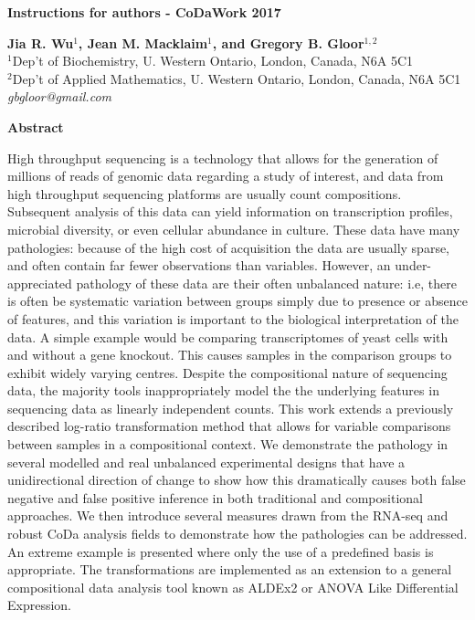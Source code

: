 \documentclass [10pt]{article}
\begin{document}
\begin{center}
\textbf{\large Instructions for authors - CoDaWork 2017}

\vskip 0.25cm

\textbf{Jia R. Wu}$^{1}$\textbf{, Jean M. Macklaim}$^{1}$\textbf{, and
Gregory B. Gloor}$^{1,2}$ \\
{\small $^{1}$Dep't of Biochemistry, U. Western Ontario, London, Canada, N6A 5C1\\
$^{2}$Dep't of Applied Mathematics, U. Western Ontario, London, Canada, N6A 5C1 \\
\textit{gbgloor@gmail.com} \\
}
\end{center}

\vskip 0.5cm {\centerline{\bf Abstract}}

High throughput sequencing is a technology that allows for the generation of millions of reads of genomic data regarding a study of interest, and data from high throughput sequencing platforms are usually count compositions. Subsequent analysis of this data can yield information on transcription profiles, microbial diversity, or even cellular abundance in culture. These data have many pathologies: because of the high cost of acquisition the data are usually sparse, and often contain far fewer observations than variables. However, an under-appreciated pathology of these data are their often unbalanced nature: i.e, there is often be systematic variation between groups simply due to presence or absence of features, and this variation is important to the biological interpretation of the data. A simple example would be comparing transcriptomes of yeast cells with and without a gene knockout. This causes samples in the comparison groups to exhibit widely varying centres. Despite the compositional nature of sequencing data, the majority tools inappropriately model the the underlying features in sequencing data as linearly independent counts. This work extends a previously described log-ratio transformation method that allows for variable comparisons between samples in a compositional context. We demonstrate the pathology in several modelled and real unbalanced experimental designs that have a unidirectional direction of change to show how this dramatically causes both false negative and false positive inference in both traditional and compositional approaches. We then introduce several measures drawn from the RNA-seq and robust CoDa analysis fields to demonstrate how the pathologies can be addressed. An extreme example is presented where only the use of a predefined basis is appropriate. The transformations are implemented as an extension to a general compositional data analysis tool known as ALDEx2 or ANOVA Like Differential Expression. 
\end{document}
